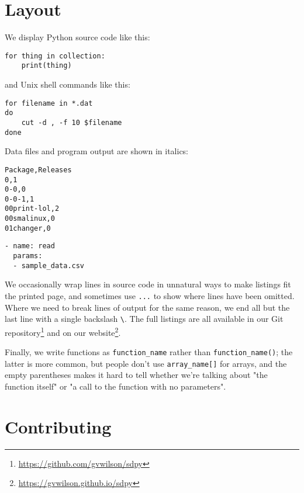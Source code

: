 \documentclass{scrbook}
\newcommand{\hreffoot}[2]{{#1}\footnote{\href{#2}{#2}}}
\begin{document}
\section{Layout}\label{introduction-layout}


We display Python source code like this:


\begin{lstlisting}[frame=single,frameround=tttt]
for thing in collection:
    print(thing)
\end{lstlisting}



\noindent and Unix shell commands like this:


\begin{lstlisting}[frame=single,frameround=tttt]
for filename in *.dat
do
    cut -d , -f 10 $filename
done
\end{lstlisting}



\noindent Data files and program output are shown in italics:


\begin{lstlisting}[frame=single,frameround=tttt]
Package,Releases
0,1
0-0,0
0-0-1,1
00print-lol,2
00smalinux,0
01changer,0
\end{lstlisting}



\begin{lstlisting}[frame=single,frameround=tttt]
- name: read
  params:
  - sample_data.csv
\end{lstlisting}



We occasionally wrap lines in source code in unnatural ways to make listings fit the printed page,
and sometimes use \texttt{...} to show where lines have been omitted.
Where we need to break lines of output for the same reason,
we end all but the last line with a single backslash \texttt{{\textbackslash}}.
The full listings are all available in \hreffoot{our Git repository}{https://github.com/gvwilson/sdpy}
and \hreffoot{on our website}{https://gvwilson.github.io/sdpy}.


Finally,
we write functions as \texttt{function\_name} rather than \texttt{function\_name()};
the latter is more common,
but people don't use \texttt{array\_name[]} for arrays,
and the empty parentheses makes it hard to tell
whether we're talking about "the function itself" or "a call to the function with no parameters".

\section{Contributing}\label{introduction-use}
\end{document}
